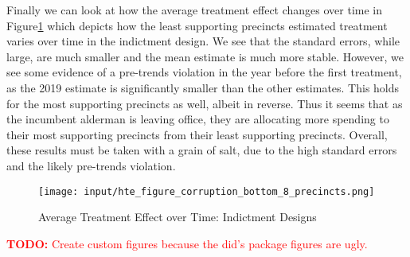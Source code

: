 Finally we can look at how the average treatment effect changes over time in Figure\ref{fig:att_comparison_corruption_bottom} which depicts how the least supporting precincts estimated treatment varies over time in the indictment design.
We see that the standard errors, while large, are much smaller and the mean estimate is much more stable.
However, we see some evidence of a pre-trends violation in the year before the first treatment, as the 2019 estimate is significantly smaller than the other estimates.
This holds for the most supporting precincts as well, albeit in reverse.
Thus it seems that as the incumbent alderman is leaving office, they are allocating more spending to their most supporting precincts from their least supporting precincts.
Overall, these results must be taken with a grain of salt, due to the high standard errors and the likely pre-trends violation.

\begin{figure}[H]
    \centering
    \texttt{[image: input/hte\_figure\_corruption\_bottom\_8\_precincts.png]}
    \caption{Average Treatment Effect over Time: Indictment Designs}
    \label{fig:att_comparison_corruption_bottom}
\end{figure}

\textcolor{red}{\textbf{TODO:} Create custom figures because the did's package figures are ugly.}